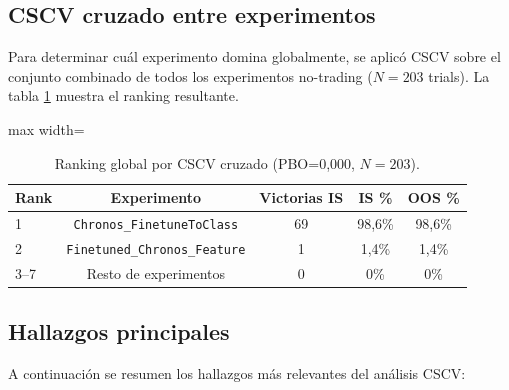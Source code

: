 \subsection{CSCV cruzado entre experimentos}

Para determinar cuál experimento domina globalmente, se aplicó CSCV sobre el conjunto combinado de todos los experimentos no-trading ($N=203$ trials). La tabla \ref{tab:cscv_cross} muestra el ranking resultante.

\begin{table}[H]
    \centering
    \caption[CSCV cruzado entre experimentos]{Ranking global por CSCV cruzado (PBO=0,000, $N=203$).}
    \small
    \begin{adjustbox}{max width=\textwidth}
    \begin{tabular}{l c c c c}
        \toprule
        \textbf{Rank} & \textbf{Experimento} & \textbf{Victorias IS} & \textbf{IS \%} & \textbf{OOS \%} \\
        \midrule
        1 & \texttt{Chronos\_FinetuneToClass} & 69 & 98,6\% & 98,6\% \\
        2 & \texttt{Finetuned\_Chronos\_Feature}   &  1 & 1,4\% & 1,4\% \\
        3--7 & Resto de experimentos               &  0 & 0\%   & 0\%   \\
        \bottomrule
    \end{tabular}
    \end{adjustbox}
    \label{tab:cscv_cross}
\end{table}

\subsection{Hallazgos principales}

A continuación se resumen los hallazgos más relevantes del análisis CSCV:

